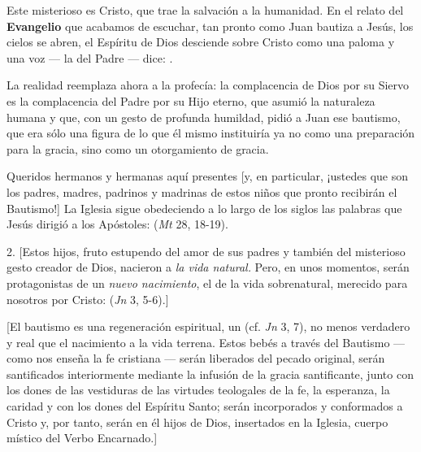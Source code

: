 \begin{body}
	Este misterioso  es Cristo, que trae la salvación a la humanidad. En el relato del \textbf{Evangelio} que acabamos de escuchar, tan pronto como Juan bautiza a Jesús, los cielos se abren, el Espíritu de Dios desciende sobre Cristo como una paloma y una voz --- la del Padre --- dice: .

	La realidad reemplaza ahora a la profecía: la complacencia de Dios por su Siervo es la complacencia del Padre por su Hijo eterno, que asumió la naturaleza humana y que, con un gesto de profunda humildad, pidió a Juan ese bautismo, que era sólo una figura de lo que él mismo instituiría ya no como una preparación para la gracia, sino como un otorgamiento de gracia.

	Queridos hermanos y hermanas aquí presentes {[}y, en particular, ¡ustedes que son los padres, madres, padrinos y madrinas de estos niños que pronto recibirán el Bautismo!{]} La Iglesia sigue obedeciendo a lo largo de los siglos las palabras que Jesús dirigió a los Apóstoles:  (\emph{Mt} 28, 18-19).

	2. {[}Estos hijos, fruto estupendo del amor de sus padres y también del misterioso gesto creador de Dios, nacieron a \emph{la vida natural.} Pero, en unos momentos, serán protagonistas de un \emph{nuevo nacimiento}, el de la vida sobrenatural, merecido para nosotros por Cristo:  (\emph{Jn} 3, 5-6).{]}

	{[}El bautismo es una regeneración espiritual, un  (cf. \emph{Jn} 3, 7), no menos verdadero y real que el nacimiento a la vida terrena. Estos bebés a través del Bautismo --- como nos enseña la fe cristiana --- serán liberados del pecado original, serán santificados interiormente mediante la infusión de la gracia santificante, junto con los dones de las vestiduras de las virtudes teologales de la fe, la esperanza, la caridad y con los dones del Espíritu Santo; serán incorporados y conformados a Cristo y, por tanto, serán en él hijos de Dios, insertados en la Iglesia, cuerpo místico del Verbo Encarnado.{]}


\end{body}
